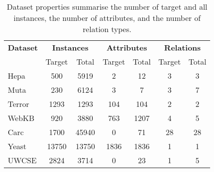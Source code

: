\begin{table}[t]
	\centering

	\caption[Properties of the relational classification datasets]{Dataset properties summarise the number of target and all instances, the number of attributes, and the number of relation types.}
		\begin{tabular}{@{}lcccccc@{}}
			\toprule
			\textbf{Dataset} 	& \multicolumn{2}{c}{\textbf{Instances}} 		& \multicolumn{2}{c}{\textbf{Attributes}}	& \multicolumn{2}{c}{\textbf{Relations}} \\
								\cmidrule(rl){2-3} \cmidrule(lr){4-5} \cmidrule(l){6-7}
								& Target 				& Total					&   Target				& Total				& Target		& Total						\\
			\midrule
			Hepa				& 500					& 5919					& 2						& 12				& 3				& 3						\\
			Muta				& 230					& 6124					& 3						& 7					& 3				& 7						\\
			Terror				& 1293					& 1293					& 104					& 104				& 2				& 2						\\
			WebKB				& 920					& 3880					& 763					& 1207				& 4				& 5						\\
			Carc				& 1700					& 45940					& 0						& 71				& 28			& 28 \\
			Yeast				& 13750					& 13750					& 1836					& 1836				& 1				& 1 \\
			UWCSE				& 2824					& 3714					& 0						& 23				& 1				& 5 \\
			\bottomrule
		\end{tabular}
	\label{tab:properties}
\end{table}






